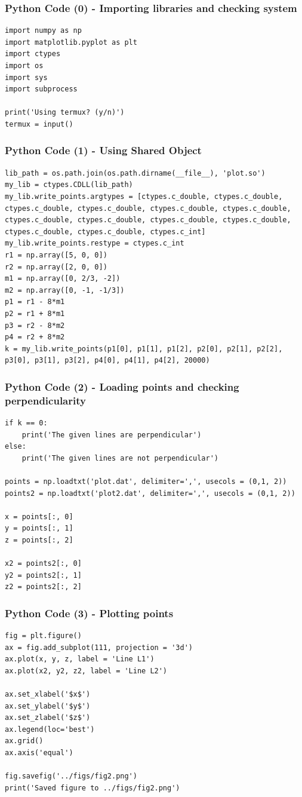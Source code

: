 \documentclass{beamer}
\begin{document}
\begin{frame}[fragile]
    \frametitle{Python Code (0) - Importing libraries and checking system}
    \begin{lstlisting}
import numpy as np
import matplotlib.pyplot as plt
import ctypes
import os
import sys
import subprocess

print('Using termux? (y/n)')
termux = input()
\end{lstlisting}
\end{frame}

\begin{frame}[fragile]
    \frametitle{Python Code (1) - Using Shared Object}
    \begin{lstlisting}
lib_path = os.path.join(os.path.dirname(__file__), 'plot.so')
my_lib = ctypes.CDLL(lib_path)
my_lib.write_points.argtypes = [ctypes.c_double, ctypes.c_double, ctypes.c_double, ctypes.c_double, ctypes.c_double, ctypes.c_double, ctypes.c_double, ctypes.c_double, ctypes.c_double, ctypes.c_double, ctypes.c_double, ctypes.c_double, ctypes.c_int]
my_lib.write_points.restype = ctypes.c_int
r1 = np.array([5, 0, 0])
r2 = np.array([2, 0, 0])
m1 = np.array([0, 2/3, -2])
m2 = np.array([0, -1, -1/3])
p1 = r1 - 8*m1
p2 = r1 + 8*m1
p3 = r2 - 8*m2
p4 = r2 + 8*m2
k = my_lib.write_points(p1[0], p1[1], p1[2], p2[0], p2[1], p2[2], p3[0], p3[1], p3[2], p4[0], p4[1], p4[2], 20000)
\end{lstlisting}
\end{frame}

\begin{frame}[fragile]
    \frametitle{Python Code (2) - Loading points and checking perpendicularity}
    \begin{lstlisting}
if k == 0:
    print('The given lines are perpendicular')
else:
    print('The given lines are not perpendicular')

points = np.loadtxt('plot.dat', delimiter=',', usecols = (0,1, 2))
points2 = np.loadtxt('plot2.dat', delimiter=',', usecols = (0,1, 2))

x = points[:, 0]
y = points[:, 1]
z = points[:, 2]

x2 = points2[:, 0]
y2 = points2[:, 1]
z2 = points2[:, 2]
\end{lstlisting}
\end{frame}

\begin{frame}[fragile]
    \frametitle{Python Code (3) - Plotting points}
    \begin{lstlisting}
fig = plt.figure()
ax = fig.add_subplot(111, projection = '3d')
ax.plot(x, y, z, label = 'Line L1')
ax.plot(x2, y2, z2, label = 'Line L2')

ax.set_xlabel('$x$')
ax.set_ylabel('$y$')
ax.set_zlabel('$z$')
ax.legend(loc='best')
ax.grid() 
ax.axis('equal')

fig.savefig('../figs/fig2.png')
print('Saved figure to ../figs/fig2.png')
\end{lstlisting}
\end{frame}
\end{document}
